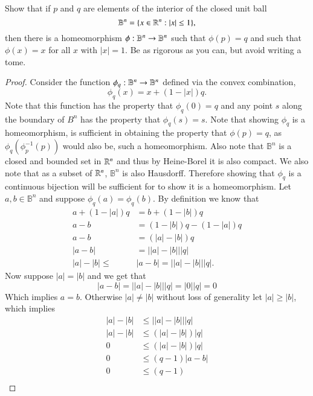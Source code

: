 \documentclass[minion]{homework651}
\begin{document}
\begin{problems}
\problem Show that if $p$ and $q$ are elements of the interior of the closed unit ball 
$$
\mathbb B^n=\{x\in \mathbb R^n:|x|\le 1\},
$$
then there is a homeomorphism $\phi:\mathbb B^n\rightarrow \mathbb B^n$ such that $\phi(p)=q$ and such that $\phi(x)=x$ for all $x$
with $|x|=1$.  Be as rigorous as you can, but avoid writing a tome.
\begin{proof} Consider the function $\phi_q:\mathbb B^n\rightarrow \mathbb B^n$ defined via the convex combination, 
    \begin{equation*}
        \phi_q(x) = x + (1 - |x|)q.
    \end{equation*}
    Note that this function has the property that $\phi_q(0) = q$ and any point $s$ along the boundary of $B^n$ has the property that $\phi_q(s) = s$. 
    Note that showing $\phi_q$ is a homeomorphism, is sufficient in obtaining the property that $\phi(p)=q$, as $\phi_q(\phi^{-1}_{p}(p))$ would also be, such a homeomorphism.
    Also note that $\mathbb B^n$ is a closed and bounded set in $\mathbb R^n$ and thus by Heine-Borel it is also compact. We also note that as a subset of $\mathbb R^n$, $\mathbb B^n$ is 
    also Hausdorff. Therefore showing that $\phi_q$ is a continuous bijection will be sufficient for to show it is a homeomorphism.
    Let $a, b \in \mathbb B^n$ and suppose $\phi_q(a) = \phi_q(b)$. By definition we know that 
    \begin{align*}
        a + (1 - |a|)q &= b + (1 - |b|)q\\
        a - b &= (1 - |b|)q - (1 - |a|)q\\
        a - b &= (|a| - |b|)q\\
        |a - b| &= \left||a| - |b|\right| |q|\\
        |a| - |b| \leq & |a - b| = \left||a| - |b|\right| |q|.
    \end{align*}
    Now suppose $|a| = |b|$ and we get that 
    \begin{equation*}
        |a - b| = \left||a| - |b|\right| |q| = |0| |q| = 0
    \end{equation*}
    Which implies $a = b$. Otherwise $|a| \neq |b|$ without loss of generality let $|a| \geq |b|$, which implies
    \begin{align*}
        |a| - |b| &\leq \left||a| - |b|\right| |q| \\
        |a| - |b| &\leq (|a| - |b|)|q| \\
        0 &\leq (|a| - |b|)|q| \\
        0 &\leq (q - 1)|a - b|\\
        0 &\leq (q - 1)\\

\end{align*}
\end{proof}
\end{problems}
\end{document}
